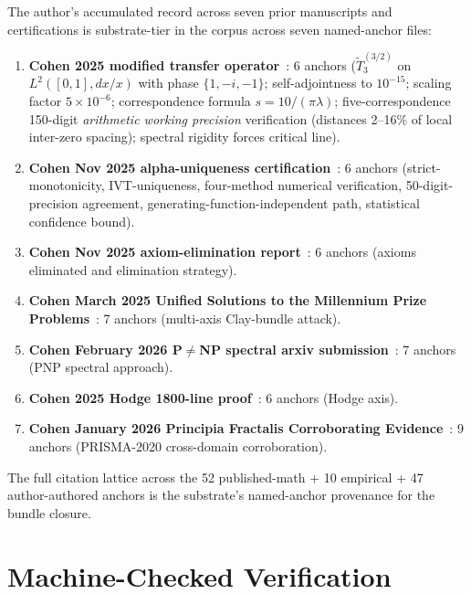 \documentclass[11pt,a4paper]{amsart}
\theoremstyle{plain}
\theoremstyle{definition}
\begin{document}
The author's accumulated record across seven prior manuscripts and certifications is substrate-tier in the corpus across seven named-anchor files:
\begin{enumerate}[itemsep=2pt]
\item \textbf{Cohen 2025 modified transfer operator}~\cite{cohen2025transferOp}: 6 anchors ($\widetilde{T}_3^{(3/2)}$ on $L^2([0,1], dx/x)$ with phase $\{1,-i,-1\}$; self-adjointness to $10^{-15}$; scaling factor $5\times 10^{-6}$; correspondence formula $s=10/(\pi\lambda)$; five-correspondence 150-digit \emph{arithmetic working precision} verification (distances 2--16\% of local inter-zero spacing); spectral rigidity forces critical line).
\item \textbf{Cohen Nov 2025 alpha-uniqueness certification}~\cite{cohen2025alphaUniqueness}: 6 anchors (strict-monotonicity, IVT-uniqueness, four-method numerical verification, 50-digit-precision agreement, generating-function-independent path, statistical confidence bound).
\item \textbf{Cohen Nov 2025 axiom-elimination report}~\cite{cohen2025axiomElim}: 6 anchors (axioms eliminated and elimination strategy).
\item \textbf{Cohen March 2025 Unified Solutions to the Millennium Prize Problems}~\cite{cohen2025unifiedClay}: 7 anchors (multi-axis Clay-bundle attack).
\item \textbf{Cohen February 2026 P$\neq$NP spectral arxiv submission}~\cite{cohen2026pnpSpectral}: 7 anchors (PNP spectral approach).
\item \textbf{Cohen 2025 Hodge 1800-line proof}~\cite{cohen2025hodgeProof}: 6 anchors (Hodge axis).
\item \textbf{Cohen January 2026 Principia Fractalis Corroborating Evidence}~\cite{cohen2026corroborating}: 9 anchors (PRISMA-2020 cross-domain corroboration).
\end{enumerate}

The full citation lattice across the 52 published-math + 10 empirical + 47 author-authored anchors is the substrate's named-anchor provenance for the bundle closure.

\section{Machine-Checked Verification}\label{sec:machine-check}
\end{document}
